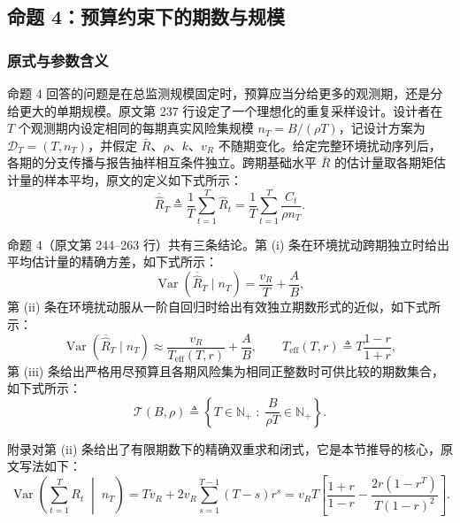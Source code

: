 
\subsection{命题 4：预算约束下的期数与规模}

\subsubsection{原式与参数含义}

命题 4 回答的问题是在总监测规模固定时，预算应当分给更多的观测期，还是分给更大的单期规模。原文第 237 行设定了一个理想化的重复采样设计。设计者在 $T$ 个观测期内设定相同的每期真实风险集规模 $n_T=B/(\rho T)$，记设计方案为 $\mathcal D_T=(T,n_T)$，并假定 $\bar R$、$\rho$、$k$、$v_R$ 不随期变化。给定完整环境扰动序列后，各期的分支传播与报告抽样相互条件独立。跨期基础水平 $\bar R$ 的估计量取各期矩估计量的样本平均，原文的定义如下式所示：
\begin{equation*}
\overline{\widehat{R}}_T \triangleq \frac{1}{T} \sum_{t=1}^T \widehat{R}_t = \frac{1}{T} \sum_{t=1}^T \frac{C_t}{\rho n_T}.
\tag{原文式 14}
\end{equation*}

命题 4（原文第 244–263 行）共有三条结论。第 (i) 条在环境扰动跨期独立时给出平均估计量的精确方差，如下式所示：
\begin{equation*}
\operatorname{Var}(\overline{\widehat{R}}_T \mid n_T) = \frac{v_R}{T} + \frac{A}{B},
\tag{原文式 15}
\end{equation*}
第 (ii) 条在环境扰动服从一阶自回归时给出有效独立期数形式的近似，如下式所示：
\begin{equation*}
\operatorname{Var}(\overline{\widehat{R}}_T \mid n_T) \approx \frac{v_R}{T_{\operatorname{eff}}(T, r)} + \frac{A}{B}, \qquad T_{\operatorname{eff}}(T, r) \triangleq T \frac{1-r}{1+r},
\tag{原文式 16}
\end{equation*}
第 (iii) 条给出严格用尽预算且各期风险集为相同正整数时可供比较的期数集合，如下式所示：
\begin{equation*}
\mathcal{T}(B, \rho) \triangleq \left\{ T \in \mathbb{N}_+ \;:\; \frac{B}{\rho T} \in \mathbb{N}_+ \right\}.
\tag{原文式 17}
\end{equation*}

附录对第 (ii) 条给出了有限期数下的精确双重求和闭式，它是本节推导的核心，原文写法如下：
\begin{equation*}
\operatorname{Var}\left(\sum_{t=1}^T R_t \;\middle|\; n_T\right) = T v_R + 2 v_R \sum_{s=1}^{T-1} (T-s) r^s = v_R T \left[\frac{1+r}{1-r} - \frac{2r(1-r^T)}{T(1-r)^2}\right].
\tag*{原文第 751 行}
\end{equation*}

